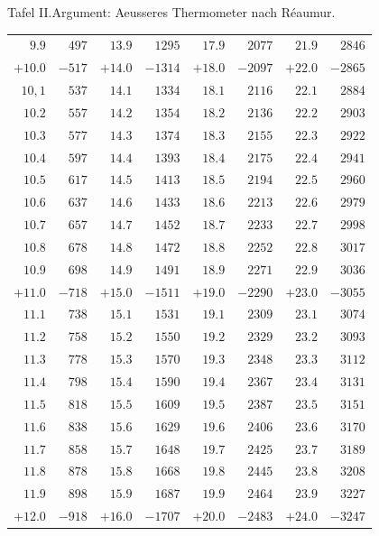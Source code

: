 \begin{GaussVIRefractionPlate}{Tafel II.\quad Argument: Aeusseres Thermometer nach Réaumur.}
{\begin{tabular}{r|r||r|r||r|r||r|r}
$9.9$ & $497$ & $13.9$ & $1295$ & $17.9$ & $2077$ & $21.9$ & $2846$\\[4pt]
$+10.0$ & $-517$ & $+14.0$ & $-1314$ & $+18.0$ & $-2097$ & $+22.0$ & $-2865$\\
$10{,}1$ & $537$ & $14.1$ & $1334$ & $18.1$ & $2116$ & $22.1$ & $2884$\\
$10.2$ & $557$ & $14.2$ & $1354$ & $18.2$ & $2136$ & $22.2$ & $2903$\\
$10.3$ & $577$ & $14.3$ & $1374$ & $18.3$ & $2155$ & $22.3$ & $2922$\\
$10.4$ & $597$ & $14.4$ & $1393$ & $18.4$ & $2175$ & $22.4$ & $2941$\\
$10.5$ & $617$ & $14.5$ & $1413$ & $18.5$ & $2194$ & $22.5$ & $2960$\\
$10.6$ & $637$ & $14.6$ & $1433$ & $18.6$ & $2213$ & $22.6$ & $2979$\\
$10.7$ & $657$ & $14.7$ & $1452$ & $18.7$ & $2233$ & $22.7$ & $2998$\\
$10.8$ & $678$ & $14.8$ & $1472$ & $18.8$ & $2252$ & $22.8$ & $3017$\\
$10.9$ & $698$ & $14.9$ & $1491$ & $18.9$ & $2271$ & $22.9$ & $3036$\\[4pt]
$+11.0$ & $-718$ & $+15.0$ & $-1511$ & $+19.0$ & $-2290$ & $+23.0$ & $-3055$\\
$11.1$ & $738$ & $15.1$ & $1531$ & $19.1$ & $2309$ & $23.1$ & $3074$\\
$11.2$ & $758$ & $15.2$ & $1550$ & $19.2$ & $2329$ & $23.2$ & $3093$\\
$11.3$ & $778$ & $15.3$ & $1570$ & $19.3$ & $2348$ & $23.3$ & $3112$\\
$11.4$ & $798$ & $15.4$ & $1590$ & $19.4$ & $2367$ & $23.4$ & $3131$\\
$11.5$ & $818$ & $15.5$ & $1609$ & $19.5$ & $2387$ & $23.5$ & $3151$\\
$11.6$ & $838$ & $15.6$ & $1629$ & $19.6$ & $2406$ & $23.6$ & $3170$\\
$11.7$ & $858$ & $15.7$ & $1648$ & $19.7$ & $2425$ & $23.7$ & $3189$\\
$11.8$ & $878$ & $15.8$ & $1668$ & $19.8$ & $2445$ & $23.8$ & $3208$\\
$11.9$ & $898$ & $15.9$ & $1687$ & $19.9$ & $2464$ & $23.9$ & $3227$\\[4pt]
$+12.0$ & $-918$ & $+16.0$ & $-1707$ & $+20.0$ & $-2483$ & $+24.0$ & $-3247$
\end{tabular}}
\end{GaussVIRefractionPlate}
\clearpage
\thispagestyle{empty}
\noindent{}%
